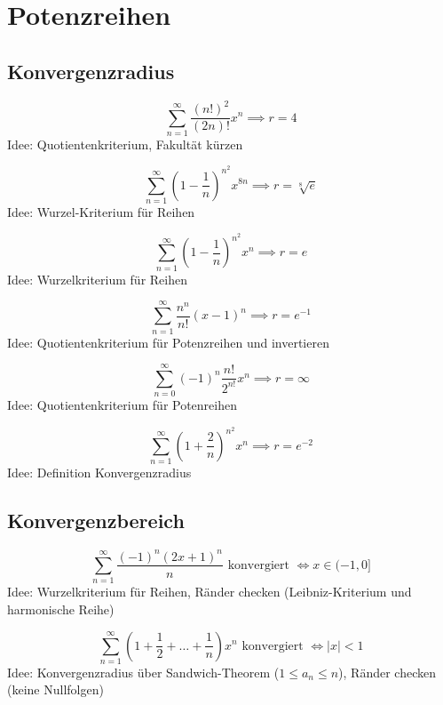 \section{Potenzreihen}
\subsection{Konvergenzradius}
\begin{displaymath}
  \sum_{n = 1}^{\infty} \frac{(n!)^2}{(2n)!}x^n \implies r = 4
\end{displaymath}
Idee: Quotientenkriterium, Fakultät kürzen

\begin{displaymath}
  \sum_{n = 1}^{\infty} \left(1 - \frac{1}{n}\right)^{n^2} x^{8n} \implies r = \sqrt[8]{e}
\end{displaymath}
Idee: Wurzel-Kriterium für Reihen

\begin{displaymath}
  \sum_{n = 1}^{\infty} \left(1 - \frac{1}{n}\right)^{n^2}x^n \implies r = e
\end{displaymath}
Idee: Wurzelkriterium für Reihen

\begin{displaymath}
  \sum_{n = 1}^{\infty} \frac{n^n}{n!} (x-1)^n \implies r = e^{-1}
\end{displaymath}
Idee: Quotientenkriterium für Potenzreihen und invertieren

\begin{displaymath}
  \sum_{n = 0}^{\infty} (-1)^n \frac{n!}{2^{n!}} x^n \implies r = \infty
\end{displaymath}
Idee: Quotientenkriterium für Potenreihen

\begin{displaymath}
  \sum_{n = 1}^{\infty} \left(1 + \frac{2}{n}\right)^{n^2} x^n \implies r = e^{-2}
\end{displaymath}
Idee: Definition Konvergenzradius

\subsection{Konvergenzbereich}
\begin{displaymath}
  \sum_{n = 1}^{\infty} \frac{(-1)^n(2x+1)^n}{n} \text{ konvergiert } \iff x \in (-1, 0]
\end{displaymath}
Idee: Wurzelkriterium für Reihen, Ränder checken (Leibniz-Kriterium und harmonische Reihe)

\begin{displaymath}
  \sum_{n = 1}^{\infty} \left(1+\frac{1}{2}+\dots+\frac{1}{n}\right)x^n \text{ konvergiert } \iff |x| < 1
\end{displaymath}
Idee: Konvergenzradius über Sandwich-Theorem ($1 \leq a_n \leq n$), Ränder checken (keine Nullfolgen)

